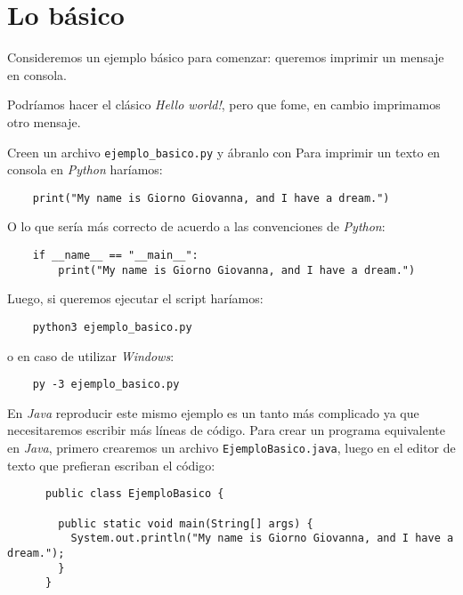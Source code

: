\section{Lo básico}
  Consideremos un ejemplo básico para comenzar: queremos imprimir un mensaje en consola.

  Podríamos hacer el clásico \textit{Hello world!}, pero que fome, en cambio imprimamos
  otro mensaje.

  Creen un archivo \texttt{ejemplo\_basico.py} y ábranlo con 
  Para imprimir un texto en consola en \textit{Python} haríamos:

  \begin{verbatim}
    print("My name is Giorno Giovanna, and I have a dream.")      
  \end{verbatim}

  O lo que sería más correcto de acuerdo a las convenciones de \textit{Python}:

  \begin{verbatim}
    if __name__ == "__main__":
        print("My name is Giorno Giovanna, and I have a dream.")
  \end{verbatim}

  Luego, si queremos ejecutar el script haríamos:

  \begin{verbatim}
    python3 ejemplo_basico.py
  \end{verbatim}

  o en caso de utilizar \textit{Windows}:

  \begin{verbatim}
    py -3 ejemplo_basico.py
  \end{verbatim}

  En \textit{Java} reproducir este mismo ejemplo es un tanto más complicado ya que 
  necesitaremos escribir más líneas de código.
  Para crear un programa equivalente en \textit{Java}, primero crearemos un archivo 
  \texttt{EjemploBasico.java}, luego en el editor de texto que prefieran escriban el 
  código:
  \begin{listing}[ht!]
    \begin{verbatim}
      public class EjemploBasico {

        public static void main(String[] args) {
          System.out.println("My name is Giorno Giovanna, and I have a dream.");
        }
      }
    \end{verbatim}
  \end{listing}

